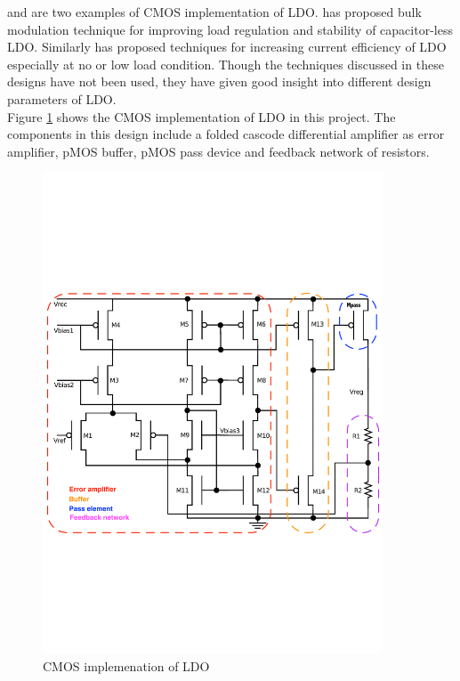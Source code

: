 \documentclass[12pt,a4paper,UKenglish]{article}
\begin{document}
\cite{ldo_bulkmod} and \cite{ldo_quiescent} are two examples of CMOS implementation of LDO. \cite{ldo_bulkmod} has proposed bulk modulation technique for improving load regulation and stability of capacitor-less LDO. Similarly \cite{ldo_quiescent} has  proposed techniques for increasing current efficiency of LDO especially at no or low load condition. Though the techniques discussed in these designs have not been used, they have given good insight into different design parameters of LDO.  \\

Figure \ref{ldo_cmos} shows the CMOS implementation of LDO in this project. The components in this design include a folded cascode differential amplifier as error amplifier, pMOS buffer, pMOS pass device and feedback network of resistors. 

\begin{figure}[htbp] %
   \centering
   \includegraphics[width=0.9\textwidth]{img/sch_ldo_label.pdf} 
   \caption{CMOS implemenation of LDO}
   \label{ldo_cmos}
\end{figure}
\end{document}
